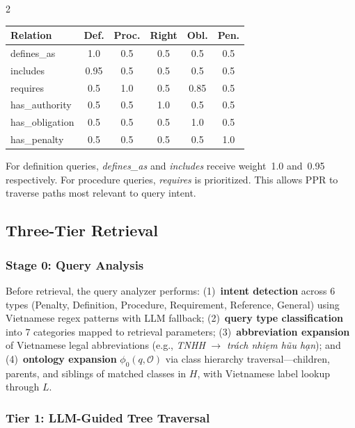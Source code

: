 \documentclass[11pt,a4paper]{article}
\begin{document}
\begin{multicols}{2}
\vspace{0.3em}
\noindent
\centering\small
{}
\label{tab:intent-weights}
\begin{tabular}{l@{\hskip 4pt}c@{\hskip 4pt}c@{\hskip 4pt}c@{\hskip 4pt}c@{\hskip 4pt}c}
\toprule
\textbf{Relation} & \textbf{Def.} & \textbf{Proc.} & \textbf{Right} & \textbf{Obl.} & \textbf{Pen.} \\
\midrule
defines\_as & 1.0 & 0.5 & 0.5 & 0.5 & 0.5 \\
includes & 0.95 & 0.5 & 0.5 & 0.5 & 0.5 \\
requires & 0.5 & 1.0 & 0.5 & 0.85 & 0.5 \\
has\_authority & 0.5 & 0.5 & 1.0 & 0.5 & 0.5 \\
has\_obligation & 0.5 & 0.5 & 0.5 & 1.0 & 0.5 \\
has\_penalty & 0.5 & 0.5 & 0.5 & 0.5 & 1.0 \\
\bottomrule
\end{tabular}
\normalsize
\justifying
\vspace{0.3em}

For definition queries, \textit{defines\_as} and \textit{includes} receive weight~1.0 and~0.95 respectively. For procedure queries, \textit{requires} is prioritized. This allows PPR to traverse paths most relevant to query intent.

\subsection{Three-Tier Retrieval}

\subsubsection{Stage 0: Query Analysis}

Before retrieval, the query analyzer performs: (1)~\textbf{intent detection} across 6 types (Penalty, Definition, Procedure, Requirement, Reference, General) using Vietnamese regex patterns with LLM fallback; (2)~\textbf{query type classification} into 7 categories mapped to retrieval parameters; (3)~\textbf{abbreviation expansion} of Vietnamese legal abbreviations (e.g., \textit{TNHH} $\to$ \textit{tr\'ach nhi\d{e}m h\~{u}u h\d{a}n}); and (4)~\textbf{ontology expansion} $\phi_0(q, \mathcal{O})$ via class hierarchy traversal---children, parents, and siblings of matched classes in $H$, with Vietnamese label lookup through $L$.

\subsubsection{Tier 1: LLM-Guided Tree Traversal}


\end{multicols}
\end{document}
